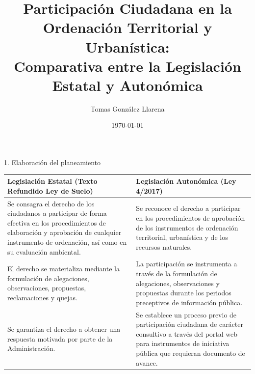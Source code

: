 \documentclass[10pt, aspectratio=169]{beamer}
\title[Participación Ciudadana]{
    Participación Ciudadana en la Ordenación Territorial y Urbanística: \\
    Comparativa entre la Legislación Estatal y Autonómica
}
\author{Tomas González Llarena}
\date{\today}
\begin{document}
\begin{frame}
    \titlepage
\end{frame}

\begin{frame}{1. Elaboración del planeamiento}
    \small
    \begin{tabularx}{\textwidth}{@{}X X@{}}
        \toprule
        \textbf{Legislación Estatal (Texto Refundido Ley de Suelo)} & \textbf{Legislación Autonómica (Ley 4/2017)} \\
        \midrule
        Se consagra el derecho de los ciudadanos a participar de forma efectiva en los procedimientos de elaboración y aprobación de cualquier instrumento de ordenación, así como en su evaluación ambiental. & Se reconoce el derecho a participar en los procedimientos de aprobación de los instrumentos de ordenación territorial, urbanística y de los recursos naturales. \\
        \midrule
        El derecho se materializa mediante la formulación de alegaciones, observaciones, propuestas, reclamaciones y quejas. & La participación se instrumenta a través de la formulación de alegaciones, observaciones y propuestas durante los periodos preceptivos de información pública. \\
        \midrule
        Se garantiza el derecho a obtener una respuesta motivada por parte de la Administración. & Se establece un proceso previo de participación ciudadana de carácter consultivo a través del portal web para instrumentos de iniciativa pública que requieran documento de avance. \\
        \bottomrule
    \end{tabularx}
 \end{frame}   

 

%     
\end{document}
